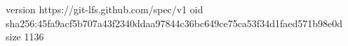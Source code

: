version https://git-lfs.github.com/spec/v1
oid sha256:45fa9acf5b707a43f2340ddaa97844c36bc649ce75ca53f34d1faed571b98e0d
size 1136
